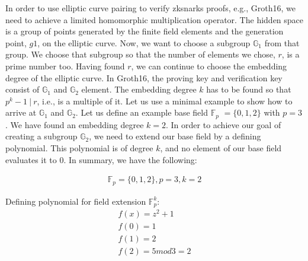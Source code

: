 In order to use elliptic curve pairing to verify \acrshort{zksnark}s proofs, e.g., Groth16, we need to achieve a limited homomorphic multiplication operator. The hidden space is a group of points generated by the finite field elements and the generation point, \(g1\), on the elliptic curve. Now, we want to choose a subgroup \begin{math} \mathbb{G}_1\end{math} from that group. We choose that subgroup so that the number of elements we chose, \(r\), is a prime number too. Having found \(r\), we can continue to choose the embedding degree of the elliptic curve. In Groth16, the proving key and verification key consist of \begin{math} \mathbb{G}_1\end{math} and \begin{math} \mathbb{G}_2\end{math} element. The embedding degree \(k\) has to be found so that \(p^k-1\ |\ r\), i.e., is a multiple of it. Let us use a minimal example to show how to arrive at \begin{math} \mathbb{G}_1\end{math} and \begin{math} \mathbb{G}_2\end{math}.
Let us define an example base field \begin{math}\mathbb{F}_p\end{math} \(= \{0,1,2\}\) with \(p = 3\). We have found an embedding degree \(k=2\). In order to achieve our goal of creating a subgroup \begin{math} \mathbb{G}_2\end{math}, we need to extend our base field by a defining polynomial. This polynomial is of degree \(k\), and no element of our base field evaluates it to 0. In summary, we have the following:

\begin{align}
    \mathbb{F}_p = \{0,1,2\}, p = 3, k = 2
\end{align}

Defining polynomial for field extension \begin{math}\mathbb{F}_p^k\end{math}: 
\begin{align*}
    f(x) = z^2 +1 \\
    f(0) = 1\\
    f(1) = 2\\
    f(2) = 5 mod 3 = 2
\end{align*}

